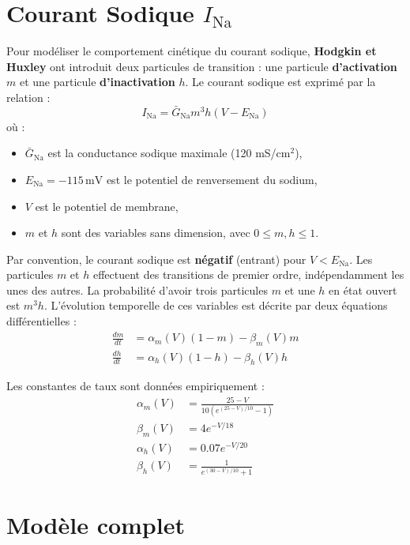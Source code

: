 \section{Courant Sodique $I_{\text{Na}}$}

Pour modéliser le comportement cinétique du courant sodique, \textbf{Hodgkin et Huxley} ont introduit deux particules de transition : une particule \textbf{d'activation} $m$ et une particule \textbf{d'inactivation} $h$. Le courant sodique est exprimé par la relation :
\begin{equation}
I_{\text{Na}} = \bar{G}_{\text{Na}} m^3 h (V - E_{\text{Na}})
\label{eq:6}
\end{equation}
où :
\begin{itemize}
	\item $\bar{G}_{\text{Na}}$ est la conductance sodique maximale (120 mS/cm$^2$),
	\item $E_{\text{Na}} = -115\, \text{mV}$ est le potentiel de renversement du sodium,
	\item $V$ est le potentiel de membrane,
	\item $m$ et $h$ sont des variables sans dimension, avec $0 \leq m,h \leq 1$.
\end{itemize}

Par convention, le courant sodique est \textbf{négatif} (entrant) pour $V < E_{\text{Na}}$. 
Les particules $m$ et $h$ effectuent des transitions de premier ordre, indépendamment les unes des autres. La probabilité d'avoir trois particules $m$ et une $h$ en état ouvert est $m^3 h$. L'évolution temporelle de ces variables est décrite par deux équations différentielles :
\begin{align}
	\frac{dm}{dt} &= \alpha_m(V)(1 - m) - \beta_m(V) m \label{eq:7} \\
	\frac{dh}{dt} &= \alpha_h(V)(1 - h) - \beta_h(V) h     \label{eq:8}
\end{align}

Les constantes de taux sont données empiriquement :
\begin{align}
	\alpha_m(V) &= \frac{25 - V}{10 \left( e^{(25 - V)/10} - 1 \right)} \label{eq:9} \\
	\beta_m(V) &= 4 e^{-V/18} \label{eq:10} \\
	\alpha_h(V) &= 0.07 e^{-V/20} \label{eq:11} \\
	\beta_h(V) &= \frac{1}{e^{(30 - V)/10} + 1}     \label{eq:12}
\end{align}

\section{Modèle complet}

